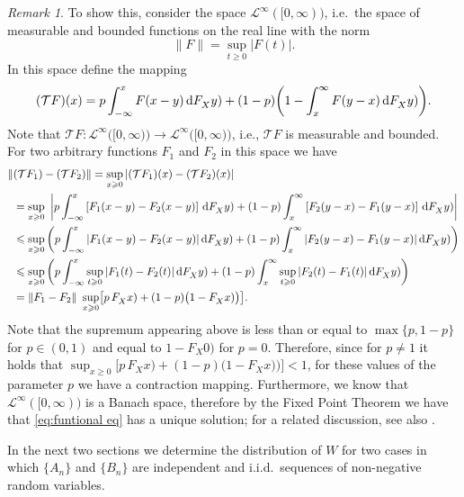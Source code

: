 \documentclass[reqno, 11pt, a4paper]{article}
\theoremstyle{plain}
\theoremstyle{remark}
\newtheorem{remark}{Remark}
\numberwithin{equation}{section}
\begin{document}
\begin{remark}
To show this, consider the space $\mathcal{L}^\infty([0,\infty))$, i.e.\ the space of measurable and bounded functions on the real line with the norm
$$
\|F\|= \sup_{t \geqslant 0} |F(t)|.
$$
In this space define the mapping
$$
(\mathcal{T}F)(x)=p \int^x_{-\infty} F(x-y)\,{\rm d}{\mbox{$F_X^{}$}}y)+(1-p)\biggl(1-\int_x^\infty F(y-x)\,{\rm d}{\mbox{$F_X^{}$}}y)\biggr).
$$
Note that $\mathcal{T}F:\mathcal{L}^\infty\bigl([0,\infty)\bigr) \rightarrow \mathcal{L}^\infty\bigl([0,\infty)\bigr)$, i.e., $\mathcal{T}F$ is measurable and bounded. For two arbitrary functions $F_1$ and $F_2$ in this space we have
\begin{align*}
\|&(\mathcal{T}F_1)-(\mathcal{T}F_2)\|=\sup_{x \geqslant 0} \left|(\mathcal{T}F_1)(x)-(\mathcal{T}F_2)(x)\right|\\
&=\sup_{x \geqslant 0}\ \left|p\int^x_{-\infty}\left[F_1(x-y)-F_2(x-y)\right]\,{\rm d}{\mbox{$F_X^{}$}}y)+(1-p)\int_x^\infty\left[F_2(y-x)-F_1(y-x)\right]\,{\rm d}{\mbox{$F_X^{}$}}y)\right|\\
&\leqslant \sup_{x \geqslant 0}\left(p \int^x_{-\infty}|F_1(x-y)-F_2(x-y)|\,{\rm d}{\mbox{$F_X^{}$}}y)+(1-p)\int_x^\infty |F_2(y-x)-F_1(y-x)|\,{\rm d}{\mbox{$F_X^{}$}}y)\right)\\
&\leqslant \sup_{x \geqslant 0}\left(p \int^x_{-\infty}\sup_{t \geqslant 0}|F_1(t)-F_2(t)|\,{\rm d}{\mbox{$F_X^{}$}}y)+(1-p)\int_x^\infty \sup_{t \geqslant 0}|F_2(t)-F_1(t)|\,{\rm d}{\mbox{$F_X^{}$}}y)\right)\\
&=\|F_1-F_2\|\ \sup_{x \geqslant 0}\bigl[p\,{\mbox{$F_X^{}$}}x)+(1-p)\bigr(1-{\mbox{$F_X^{}$}}x)\bigr)\bigr].
\end{align*}
Note that the supremum appearing above is less than or equal to $\max\{p,1-p\}$ for $p\in(0,1)$ and equal to $1-{\mbox{$F_X^{}$}}0)$ for $p=0$. Therefore, since for $p\neq 1$ it holds that $\sup_{x \geqslant 0}\bigl[p\,{\mbox{$F_X^{}$}}x)+(1-p)\bigr(1-{\mbox{$F_X^{}$}}x)\bigr)\bigr]<1$, for these values of the parameter $p$ we have a contraction mapping. Furthermore, we know that $\mathcal{L}^\infty([0,\infty))$ is a Banach space, therefore by the Fixed Point Theorem we have that \eqref{eq:funtional eq} has a unique solution; for a related discussion, see also \cite{vlasiou05a}.
\end{remark}

In the next two sections we determine the distribution of $W$ for two cases in which $\{A_n\}$ and $\{B_n\}$ are independent and i.i.d.\ sequences of non-negative random variables.
\end{document}
